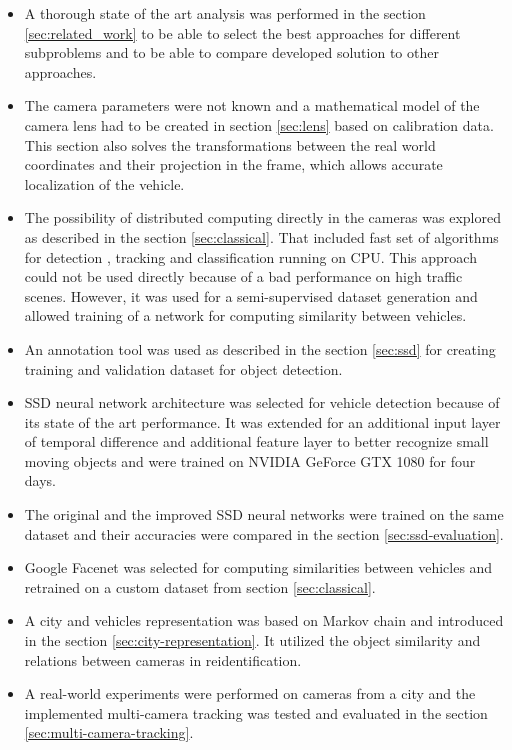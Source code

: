 \documentclass[a4paper,11pt,titlepage,twoside]{article}
\numberwithin{figure}{section}
\begin{document}
\begin{itemize}

\item A thorough state of the art analysis was performed in the section \ref{sec:related_work} to be able to select the best approaches for different subproblems and to be able to compare developed solution to other approaches.

\item The camera parameters were not known and a mathematical model of the camera lens had to be created in section \ref{sec:lens} based on calibration data. This section also solves the transformations between the real world coordinates and their projection in the frame, which allows accurate localization of the vehicle.

\item The possibility of distributed computing directly in the cameras was explored as described in the section \ref{sec:classical}. That included fast set of algorithms for detection \cite{piccardi2004background}, tracking \cite{optical-flow} and classification \cite{haar} running on CPU. This approach could not be used directly because of a bad performance on high traffic scenes. However, it was used for a semi-supervised dataset generation and allowed training of a network for computing similarity between vehicles.

\item An annotation tool was used as described in the section \ref{sec:ssd} for creating training and validation dataset for object detection.

\item SSD \cite{liu2016ssd} neural network architecture was selected for vehicle detection because of its state of the art performance. It was extended for an additional input layer of temporal difference and additional feature layer to better recognize small moving objects and were trained on NVIDIA GeForce GTX 1080 for four days.

\item The original and the improved SSD neural networks were trained on the same dataset and their accuracies were compared in the section \ref{sec:ssd-evaluation}.

\item Google Facenet \cite{schroff2015facenet} was selected for computing similarities between vehicles and retrained on a custom dataset from section \ref{sec:classical}.

\item A city and vehicles representation was based on Markov chain and introduced in the section \ref{sec:city-representation}. It utilized the object similarity and relations between cameras in reidentification.

\item A real-world experiments were performed on cameras from a city and the implemented multi-camera tracking was tested and evaluated in the section \ref{sec:multi-camera-tracking}.

\end{itemize}
\end{document}
